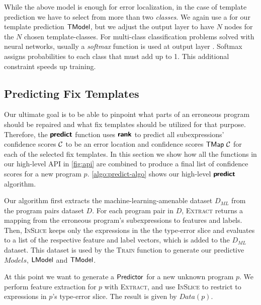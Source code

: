 While the above model is enough for error localization, in the case of template
prediction we have to select from more than two \emph{classes}. We again use a
\dnn for our template prediction $\mathsf{TModel}$, but we adjust the output layer to
have $N$ nodes for the $N$ chosen template-classes. For multi-class
classification problems solved with neural networks, usually a \emph{softmax}
function is used at output layer \citep{Goodfellow-et-al-2016,Bishop-book-2006}.
Softmax assigns probabilities to each class that must add up to 1.
This additional constraint speeds up training.



\subsection{Predicting Fix Templates}
\label{sec:templ-pred:predict}

Our ultimate goal is to be able to pinpoint what parts of an erroneous program
should be repaired and what fix templates should be utilized for that purpose.
Therefore, the $\bm{\mathsf{predict}}$ function uses $\bm{\mathsf{rank}}$ to predict all
subexpressions' confidence scores $\mathcal{C}$ to be an error location and confidence
scores $\mathsf{TMap}\ \mathcal{C}$ for each of the selected fix templates. In this section we
show how all the functions in our high-level API in \autoref{fig:api} are
combined to produce a final list of confidence scores for a new program $p$.
\autoref{algo:predict-algo} shows our high-level $\bm{\mathsf{predict}}$ algorithm.



Our algorithm first extracts the machine-learning-amenable dataset $D_{ML}$
from the program pairs dataset $D$. For each program pair in $D$,
\textsc{Extract} returns a mapping from the erroneous program's subexpressions
to features and labels. Then, \textsc{InSlice} keeps only the expressions in
the the type-error slice and evaluates to a list of the respective feature and
label vectors, which is added to the $D_{ML}$ dataset. This dataset
is used by the \textsc{Train} function to generate our predictive $Models$, \ie
$\mathsf{LModel}$ and $\mathsf{TModel}$.

At this point we want to generate a $\mathsf{Predictor}$ for a new unknown program
$p$. We perform feature extraction for $p$ with \textsc{Extract}, and use
\textsc{InSlice} to restrict to expressions in $p$'s type-error slice.
The result is given by $Data(p)$.

